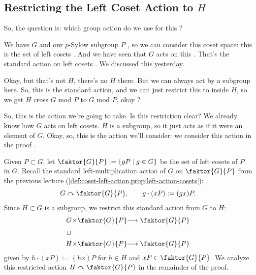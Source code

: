 \begin{proofWrapper}
\subsection{Restricting the Left Coset Action to \texorpdfstring{$H$}{H}}

\begin{speech}[00:21:10 - 00:22:43]
So, the question is: which group action do we use for this ?

We have $G$ and our $p$-Sylow subgroup $P$ , so we can consider this coset space: this is the set of left cosets . And we have seen that $G$ acts on this . That's the standard action on left cosets . We discussed this yesterday.

Okay, but that's not $H$, there's no $H$ there. But we can always act by a subgroup here. So, this is the standard action, and we can just restrict this to inside $H$, so we get $H$ cross $G$ mod $P$ to $G$ mod $P$, okay ?

So, this is the action we're going to take. Is this restriction clear? We already know how $G$ acts on left cosets. $H$ is a subgroup, so it just acts as if it were an element of $G$. Okay, so, this is the action we'll consider: we consider this action in the proof .
\end{speech}

\begin{content}
Given $P \subset G$, let $\faktor{G}{P} := \{ g P \mid g \in G \}$ be the set of left cosets of $P$ in $G$. Recall the standard left-multiplication action of $G$ on $\faktor{G}{P}$ from the previous lecture (\cref{def:coset-left-action,prop:left-action-cosets}):
\[
G \curvearrowright \faktor{G}{P}, \qquad g \cdot (x P) := (g x) P.
\]
Since $H \subset G$ is a subgroup, we restrict this standard action from $G$ to $H$:
\[
\begin{array}{c@{}c@{}c@{}l}
G & \times & \faktor{G}{P} & \longrightarrow \faktor{G}{P} \\[6pt]
\cup & & & \\[4pt]
H & \times & \faktor{G}{P} & \longrightarrow \faktor{G}{P}
\end{array}
\]
given by $h \cdot (x P) := (h x) P$ for $h \in H$ and $x P \in \faktor{G}{P}$. We analyze this restricted action $H \curvearrowright \faktor{G}{P}$ in the remainder of the proof.
\end{content}


\end{proofWrapper}
